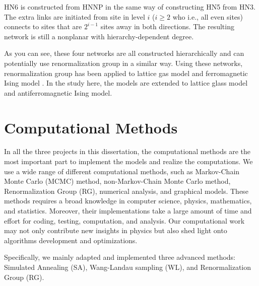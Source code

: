 HN6 \cite{Boettcher09c} is constructed from HNNP in the same way of constructing HN5 from HN3. The extra links are initiated from site in level $i$ ($i\ge2$ who
i.e., all even sites)  connects to sites that are $2^{i-1}$
sites away in both directions. The resulting network is still a nonplanar with hierarchy-dependent degree.

As you can see, these four networks are all constructed hierarchically and can potentially use renormalization group in a similar way. Using these networks, renormalization group has been applied to lattice gas model \cite{cheng2015jamming, BoHa11} and ferromagnetic Ising model \cite{Boettcher2011HNNP, boettcher2015classification}. In the study here, the models are extended to lattice glass model and antiferromagnetic Ising model. 




\section{Computational Methods}
In all the three projects in this dissertation, the computational methods are the most important part to implement the models and realize the computations. We use a wide range of different computational methods, such as Markov-Chain Monte Carlo (MCMC) method, non-Markov-Chain Monte Carlo method, Renormalization Group (RG), numerical analysis, and graphical models.
 These methods requires a broad knowledge in computer science, physics, mathematics, and statistics. Moreover, their implementations take a large amount of time and effort for coding,  testing, computation, and analysis. Our computational work may not only contribute new insights in physics but also shed light onto algorithms development and optimizations.

Specifically, we mainly adapted and implemented three advanced methods: Simulated Annealing (SA), Wang-Landau sampling (WL), and Renormalization Group (RG). 

